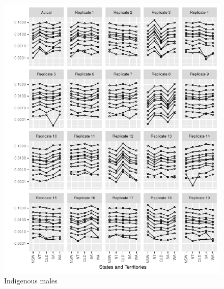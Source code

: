 \documentclass{article}
\begin{document}
\begin{figure}
  \centering
  \includegraphics{out/fig_replicate_data_Male_Indigenous_Baseline}
  \caption{Indigenous males}
\end{figure}
\newpage
\end{document}
